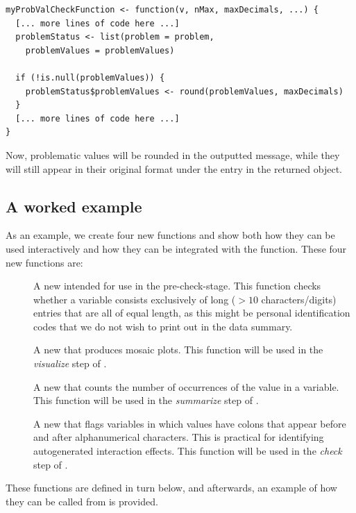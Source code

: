 \documentclass[article,shortnames]{jss}
\begin{document}
\begin{Verbatim}
myProbValCheckFunction <- function(v, nMax, maxDecimals, ...) {
  [... more lines of code here ...]
  problemStatus <- list(problem = problem,
    problemValues = problemValues)

  if (!is.null(problemValues)) {
    problemStatus$problemValues <- round(problemValues, maxDecimals)
  }
  [... more lines of code here ...]
}
\end{Verbatim}

Now, problematic values will be rounded in the outputted message, while they
will still appear in their original format under the entry  %
in the returned object.

\subsection{A worked example}

As an example, we create four new functions and show both how they can be
used interactively and how they can be integrated with the 
function. These four new functions are:
\begin{description}
\item[] A new  intended for use in the pre-check-stage. This function checks whether a variable consists exclusively of long ($> 10$ characters/digits) entries that are all of equal length, as this might be personal identification codes that we do not wish to print out in the data summary.
\item[] A new  that produces mosaic plots. This function will be used in the \textit{visualize} step of .
\item[] A new  that counts the number of occurrences of the value  in a variable. This function will be used in the \textit{summarize} step of .
\item[] A new  that flags variables in which values have colons that appear before and after alphanumerical characters. This is practical for identifying autogenerated interaction effects. This function will be used in the \textit{check} step of .
\end{description}
These functions are defined in turn below, and afterwards, an example of how they can be called from  is provided.
\end{document}
